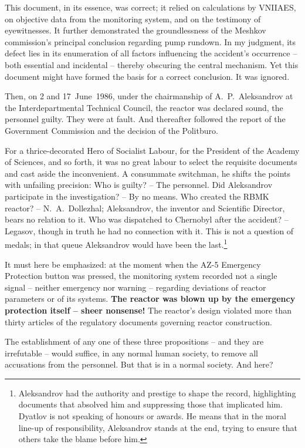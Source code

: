 \documentclass[openright]{bookest}
\begin{document}
This document, in its essence, was correct; it relied on calculations by VNIIAES, on objective data from the monitoring system, and on the testimony of eyewitnesses. It further demonstrated the groundlessness of the Meshkov commission's principal conclusion regarding pump rundown. In my judgment, its defect lies in its enumeration of all factors influencing the accident's occurrence -- both essential and incidental -- thereby obscuring the central mechanism. Yet this document might have formed the basis for a correct conclusion. It was ignored.

Then, on 2 and 17~June~1986, under the chairmanship of A.~P.~Aleksandrov at the Interdepartmental Technical Council, the reactor was declared sound, the personnel guilty. They were at fault. And thereafter followed the report of the Government Commission and the decision of the Politburo.

For a thrice-decorated Hero of Socialist Labour, for the President of the Academy of Sciences, and so forth, it was no great labour to select the requisite documents and cast aside the inconvenient. A consummate switchman, he shifts the points with unfailing precision: Who is guilty? -- The personnel. Did Aleksandrov participate in the investigation? -- By no means. Who created the RBMK reactor? -- N.~A.~Dollezhal; Aleksandrov, the inventor and Scientific Director, bears no relation to it. Who was dispatched to Chernobyl after the accident? -- Legasov, though in truth he had no connection with it. This is not a question of medals; in that queue Aleksandrov would have been the last.\footnote{Aleksandrov had the authority and prestige to shape the record, highlighting documents that absolved him and suppressing those that implicated him. Dyatlov is not speaking of honours or awards. He means that in the moral line-up of responsibility, Aleksandrov stands at the end, trying to ensure that others take the blame before him.}

It must here be emphasized: at the moment when the AZ-5 Emergency Protection button was pressed, the monitoring system recorded not a single signal -- neither emergency nor warning -- regarding deviations of reactor parameters or of its systems. \textbf{The reactor was blown up by the emergency protection itself -- sheer nonsense!} The reactor's design violated more than thirty articles of the regulatory documents governing reactor construction.

The establishment of any one of these three propositions -- and they are irrefutable -- would suffice, in any normal human society, to remove all accusations from the personnel. But that is in a normal society. And here?
\end{document}
